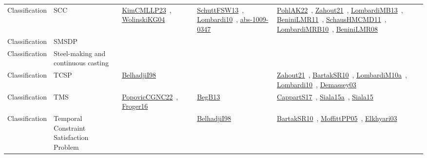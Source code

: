 {\begin{longtable}{lp{3cm}>{\raggedright\arraybackslash}p{6cm}>{\raggedright\arraybackslash}p{6cm}>{\raggedright\arraybackslash}p{8cm}}
Classification & SCC & \href{../works/KimCMLLP23.pdf}{KimCMLLP23}~\cite{KimCMLLP23}, \href{../works/WolinskiKG04.pdf}{WolinskiKG04}~\cite{WolinskiKG04} & \href{../works/SchuttFSW13.pdf}{SchuttFSW13}~\cite{SchuttFSW13}, \href{../works/Lombardi10.pdf}{Lombardi10}~\cite{Lombardi10}, \href{../works/abs-1009-0347.pdf}{abs-1009-0347}~\cite{abs-1009-0347} & \href{../works/PohlAK22.pdf}{PohlAK22}~\cite{PohlAK22}, \href{../works/Zahout21.pdf}{Zahout21}~\cite{Zahout21}, \href{../works/LombardiMB13.pdf}{LombardiMB13}~\cite{LombardiMB13}, \href{../works/BeniniLMR11.pdf}{BeniniLMR11}~\cite{BeniniLMR11}, \href{../works/SchausHMCMD11.pdf}{SchausHMCMD11}~\cite{SchausHMCMD11}, \href{../works/LombardiMRB10.pdf}{LombardiMRB10}~\cite{LombardiMRB10}, \href{../works/BeniniLMR08.pdf}{BeniniLMR08}~\cite{BeniniLMR08}\\
Classification & SMSDP &  &  & \\
Classification & Steel-making and continuous casting &  &  & \\
Classification & TCSP & \href{../works/BelhadjiI98.pdf}{BelhadjiI98}~\cite{BelhadjiI98} &  & \href{../works/Zahout21.pdf}{Zahout21}~\cite{Zahout21}, \href{../works/BartakSR10.pdf}{BartakSR10}~\cite{BartakSR10}, \href{../works/LombardiM10a.pdf}{LombardiM10a}~\cite{LombardiM10a}, \href{../works/Lombardi10.pdf}{Lombardi10}~\cite{Lombardi10}, \href{../works/Demassey03.pdf}{Demassey03}~\cite{Demassey03}\\
Classification & TMS & \href{../works/PopovicCGNC22.pdf}{PopovicCGNC22}~\cite{PopovicCGNC22}, \href{../works/Froger16.pdf}{Froger16}~\cite{Froger16} & \href{../works/BegB13.pdf}{BegB13}~\cite{BegB13} & \href{../works/CappartS17.pdf}{CappartS17}~\cite{CappartS17}, \href{../works/Siala15a.pdf}{Siala15a}~\cite{Siala15a}, \href{../works/Siala15.pdf}{Siala15}~\cite{Siala15}\\
Classification & Temporal Constraint Satisfaction Problem &  & \href{../works/BelhadjiI98.pdf}{BelhadjiI98}~\cite{BelhadjiI98} & \href{../works/BartakSR10.pdf}{BartakSR10}~\cite{BartakSR10}, \href{../works/MoffittPP05.pdf}{MoffittPP05}~\cite{MoffittPP05}, \href{../works/Elkhyari03.pdf}{Elkhyari03}~\cite{Elkhyari03}\\

\end{longtable}}

